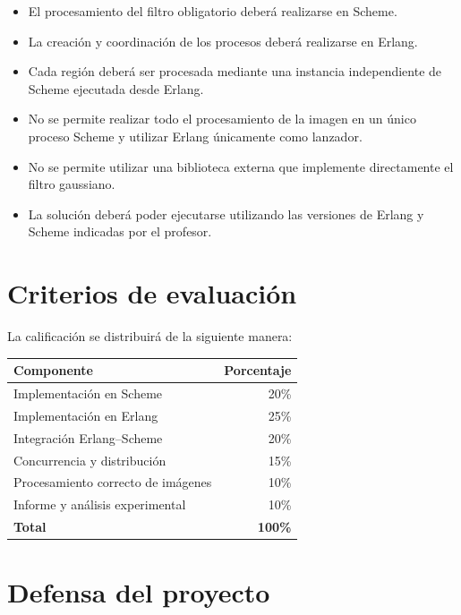 \documentclass[11pt,a4paper]{article}
\begin{document}
\begin{itemize}

\item El procesamiento del filtro obligatorio deberá realizarse en
Scheme.

\item La creación y coordinación de los procesos deberá realizarse
en Erlang.

\item Cada región deberá ser procesada mediante una instancia
independiente de Scheme ejecutada desde Erlang.

\item No se permite realizar todo el procesamiento de la imagen en
un único proceso Scheme y utilizar Erlang únicamente como
lanzador.

\item No se permite utilizar una biblioteca externa que implemente
directamente el filtro gaussiano.

\item La solución deberá poder ejecutarse utilizando las versiones
de Erlang y Scheme indicadas por el profesor.

\end{itemize}

\section{Criterios de evaluación}

La calificación se distribuirá de la siguiente manera:

\begin{center}
\begin{tabular}{lr}
\hline
\textbf{Componente} & \textbf{Porcentaje}\\
\hline
Implementación en Scheme & 20\%\\
Implementación en Erlang & 25\%\\
Integración Erlang--Scheme & 20\%\\
Concurrencia y distribución & 15\%\\
Procesamiento correcto de imágenes & 10\%\\
Informe y análisis experimental & 10\%\\
\hline
\textbf{Total} & \textbf{100\%}\\
\hline
\end{tabular}
\end{center}

\section{Defensa del proyecto}
\end{document}

